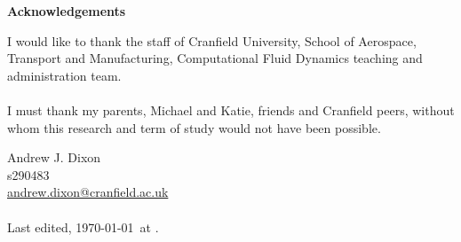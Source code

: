 \begin{centering}
\begin{minipage}[c]{0.9\textwidth}
\centering
\Huge \textbf{Acknowledgements} \normalsize

\vspace{15mm}
\justify

I would like to thank the staff of Cranfield University, School of Aerospace, Transport and Manufacturing, Computational Fluid Dynamics teaching and administration team. 
\\ \\
I must thank my parents, Michael and Katie, friends and Cranfield peers, without whom this research and term of study would not have been possible.

\end{minipage} 
\vfill
\end{centering}

\vfill

\pagebreak




\pagebreak




\mbox

\vfill
\noindent Andrew J. Dixon\\
s290483\\
\href{mailto:andrew.dixon@cranfield.ac.uk}{andrew.dixon@cranfield.ac.uk}\\
\\
Last edited, \today\ at \currenttime.

\pagebreak
\newpage

